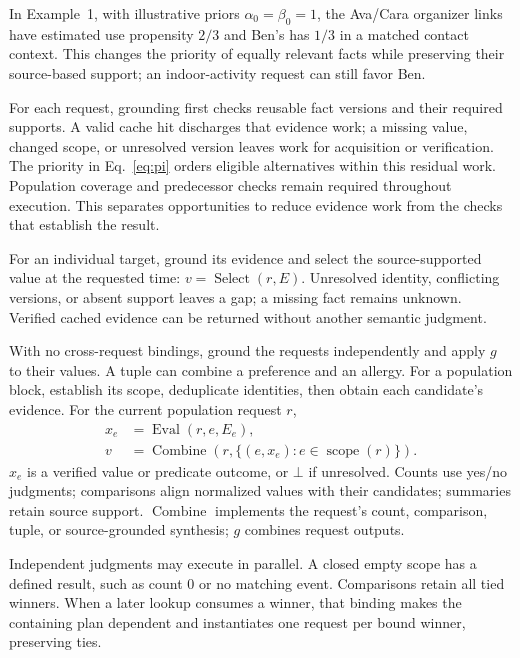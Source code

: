 

In Example~1, with illustrative priors $\alpha_0=\beta_0=1$, the Ava/Cara organizer
links have estimated use propensity $2/3$ and Ben's has $1/3$ in a
matched contact context.
This changes the priority of equally relevant facts while preserving
their source-based support; an indoor-activity request can still favor Ben.

For each request, grounding first checks reusable fact versions and
their required supports. A valid cache hit discharges that evidence
work; a missing value, changed scope, or unresolved version leaves work
for acquisition or verification. The priority in Eq.~\eqref{eq:pi}
orders eligible alternatives within this residual work. Population
coverage and predecessor checks remain required throughout execution.
This separates opportunities to reduce evidence work from the checks
that establish the result.

For an individual target, ground its evidence and select the
source-supported value at the requested time:
$v=\operatorname{Select}(r,E)$.
Unresolved identity, conflicting versions, or absent support leaves a
gap; a missing fact remains unknown.
Verified cached evidence can be returned without another semantic judgment.

With no cross-request bindings, ground the requests independently and
apply $g$ to their values. A tuple can combine a preference and an allergy.
For a population block, establish its scope, deduplicate identities,
then obtain each candidate's evidence. For the current population request $r$,
\begin{equation}
\label{eq:new-reduce}
\begin{aligned}
x_e&=\operatorname{Eval}(r,e,E_e),\\
v&=\operatorname{Combine}(r,\{(e,x_e):e\in\operatorname{scope}(r)\}).
\end{aligned}
\end{equation}
$x_e$ is a verified value or predicate outcome, or $\bot$ if unresolved.
Counts use yes/no judgments; comparisons align normalized values with
their candidates; summaries retain source support.
$\operatorname{Combine}$ implements the request's count, comparison,
tuple, or source-grounded synthesis; $g$ combines request outputs.

Independent judgments may execute in parallel. A closed empty scope has
a defined result, such as count 0 or no matching event.
Comparisons retain all tied winners. When a later lookup consumes a winner,
that binding makes the containing plan dependent and instantiates one
request per bound winner, preserving ties.

